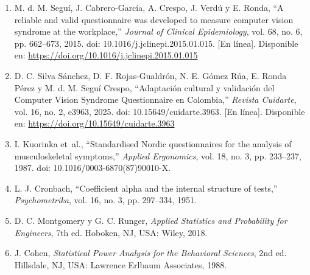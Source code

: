 \begin{enumerate}[leftmargin=1.8em,label=\lbrack\arabic*\rbrack,itemsep=0.6em]
\item M. d. M. Seguí, J. Cabrero-García, A. Crespo, J. Verdú y E. Ronda, ``A reliable and valid questionnaire was developed to measure computer vision syndrome at the workplace,'' \emph{Journal of Clinical Epidemiology}, vol. 68, no. 6, pp. 662--673, 2015. doi: 10.1016/j.jclinepi.2015.01.015. [En línea]. Disponible en: \url{https://doi.org/10.1016/j.jclinepi.2015.01.015}

\item D. C. Silva Sánchez, D. F. Rojas-Gualdrón, N. E. Gómez Rúa, E. Ronda Pérez y M. d. M. Seguí Crespo, ``Adaptación cultural y validación del Computer Vision Syndrome Questionnaire en Colombia,'' \emph{Revista Cuidarte}, vol. 16, no. 2, e3963, 2025. doi: 10.15649/cuidarte.3963. [En línea]. Disponible en: \url{https://doi.org/10.15649/cuidarte.3963}

\item I. Kuorinka et~al., ``Standardised Nordic questionnaires for the analysis of musculoskeletal symptoms,'' \emph{Applied Ergonomics}, vol. 18, no. 3, pp. 233--237, 1987. doi: 10.1016/0003-6870(87)90010-X.

\item L. J. Cronbach, ``Coefficient alpha and the internal structure of tests,'' \emph{Psychometrika}, vol. 16, no. 3, pp. 297--334, 1951.

\item D. C. Montgomery y G. C. Runger, \emph{Applied Statistics and Probability for Engineers}, 7th ed. Hoboken, NJ, USA: Wiley, 2018.

\item J. Cohen, \emph{Statistical Power Analysis for the Behavioral Sciences}, 2nd ed. Hillsdale, NJ, USA: Lawrence Erlbaum Associates, 1988.

\end{enumerate}


